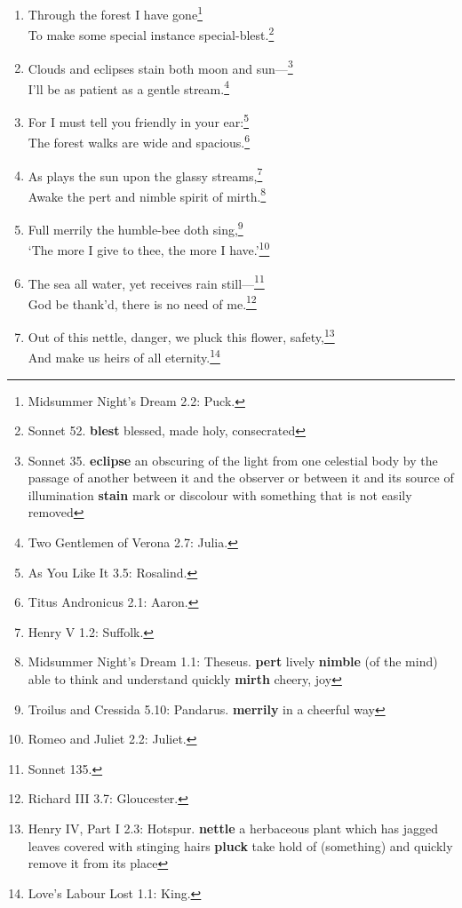 \documentclass[17pt,twoside]{extarticle}
\begin{document}
\begin{enumerate}
{    \textbf{shun} persistently avoid, ignore, or reject (someone or
    something) through antipathy or caution}\\The wild sea of my
  conscience, I did steer.\footnote{Henry VIII 2.4: King.}
\item
  Through the forest I have gone\footnote{Midsummer Night's Dream 2.2:
    Puck.}\\To make some special instance special-blest.\footnote{Sonnet
    52. \textbf{blest} blessed, made holy, consecrated}
\item
  Clouds and eclipses stain both moon and sun---\footnote{Sonnet 35.
    \textbf{eclipse} an obscuring of the light from one celestial body
    by the passage of another between it and the observer or between it
    and its source of illumination \textbf{stain} mark or discolour with
    something that is not easily removed}\\I'll be as patient as a
  gentle stream.\footnote{Two Gentlemen of Verona 2.7: Julia.}
\item
  For I must tell you friendly in your ear:\footnote{As You Like It 3.5:
    Rosalind.}\\The forest walks are wide and spacious.\footnote{Titus
    Andronicus 2.1: Aaron.}
\item
  As plays the sun upon the glassy streams,\footnote{Henry V 1.2:
    Suffolk.}\\Awake the pert and nimble spirit of mirth.\footnote{Midsummer
    Night's Dream 1.1: Theseus. \textbf{pert} lively \textbf{nimble} (of
    the mind) able to think and understand quickly \textbf{mirth}
    cheery, joy}
\item
  Full merrily the humble-bee doth sing,\footnote{Troilus and Cressida
    5.10: Pandarus. \textbf{merrily} in a cheerful way}\\`The more I
  give to thee, the more I have.'\footnote{Romeo and Juliet 2.2: Juliet.}
\item
  The sea all water, yet receives rain still---\footnote{Sonnet 135.}\\God
  be thank'd, there is no need of me.\footnote{Richard III 3.7:
    Gloucester.}
\item
  Out of this nettle, danger, we pluck this flower, safety,\footnote{Henry
    IV, Part I 2.3: Hotspur. \textbf{nettle} a herbaceous plant which
    has jagged leaves covered with stinging hairs \textbf{pluck} take
    hold of (something) and quickly remove it from its place}\\And make
  us heirs of all eternity.\footnote{Love's Labour Lost 1.1: King.
}
\end{enumerate}
\end{document}

